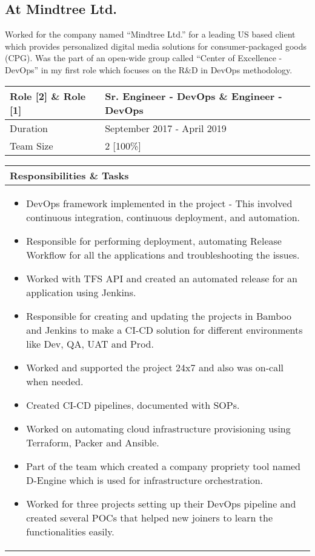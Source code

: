 \documentclass[11pt, a4paper]{article}
\begin{document}
	\subsection*{At Mindtree Ltd.}
Worked for the company named “Mindtree Ltd.” for a leading US based client which provides personalized digital media solutions for consumer-packaged goods (CPG).  Was the part of an open-wide group called “Center of Excellence - DevOps” in my first role which focuses on the R\&D in DevOps methodology.\\

\noindent\begin{tabular}{|p{1.5in}|p{5.45in}|}
\hline
\rowcolor{black!20} Role [2] \& Role [1] & Sr.  Engineer - DevOps \& Engineer - DevOps\\
\hline
Duration & September 2017 - April 2019\\
\hline
Team Size & 2 [100\%]\\
\hline
\end{tabular}
\newline
\vspace*{1mm}
\newline
\begin{tabular}{|p{7.122in}|}
\hline
\rowcolor{black!5} Responsibilities \& Tasks\\
\hline
\begin{itemize}[noitemsep, nolistsep]
\item DevOps framework implemented in the project - This involved continuous integration, continuous deployment, and automation. 
\item Responsible for performing deployment, automating Release Workflow for all the applications and troubleshooting the issues. 
\item Worked with TFS API and created an automated release for an application using Jenkins. 
\item Responsible for creating and updating the projects in Bamboo and Jenkins to make a CI-CD solution for different environments like Dev, QA, UAT and Prod. 
\item Worked and supported the project 24x7 and also was on-call when needed. 
\item Created CI-CD pipelines, documented with SOPs.
\item Worked on automating cloud infrastructure provisioning using Terraform, Packer and Ansible.
\item Part of the team which created a company propriety tool named D-Engine which is used for infrastructure orchestration.
\item Worked for three projects setting up their DevOps pipeline and created several POCs that helped new joiners to learn the functionalities easily.
\end{itemize} \\
\hline
\end{tabular}
\pagebreak
\end{document}

